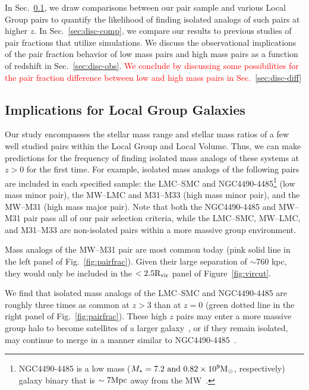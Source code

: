 \documentclass[twocolumn]{aastex631}
\newcommand{\add}[1]{\textcolor{red}{#1}}
\newcommand{\Rvir}{\ensuremath{\rm R_{vir}}}
\begin{document}
In Sec.~\ref{sec:disc-LG}, we draw comparisons between our pair sample and various Local Group pairs to quantify the likelihood of finding isolated analogs of such pairs at higher $z$.
In Sec.~\ref{sec:disc-comp}, we compare our results to previous studies of pair fractions that utilize simulations. 
We discuss the observational implications of the pair fraction behavior of low mass pairs and high mass pairs as a function of redshift
in Sec.~\ref{sec:disc-obs}.
\add{We conclude by discussing some possibilities for the pair fraction difference between low and high mass pairs in Sec.~\ref{sec:disc-diff}}

   \subsection{Implications for Local Group Galaxies}\label{sec:disc-LG}
    Our study encompasses the stellar mass range and stellar mass ratios of a few well studied pairs within the Local Group and Local Volume.
    Thus, we can make predictions for the frequency of finding isolated mass analogs of these systems at $z>0$ for the first time. 
    For example, isolated mass analogs of the following pairs are included in each specified sample:
    the LMC--SMC and NGC4490-4485\footnote{NGC4490-4485 is a low mass ($M_* = 7.2 \mbox{ and } 0.82 \times 10^9\mathrm{M}_\odot$, respectively) galaxy binary that is $\sim7\mathrm{Mpc}$ away from the MW~\citep{Theureau2007,Pearson2018}.} (low mass minor pair), the MW--LMC and M31--M33 (high mass minor pair), and the MW--M31 (high mass major pair).
    Note that both the NGC4490-4485 and MW--M31 pair pass all of our pair selection criteria, while the LMC--SMC,  MW--LMC, and M31--M33 are non-isolated pairs within a more massive group environment.

    Mass analogs of the MW--M31 pair are most common today (pink solid line in the left panel of Fig.~\ref{fig:pairfrac}). 
    Given their large separation of $\sim$760 kpc, they would only be included in the $<2.5\Rvir$ panel of Figure~\ref{fig:vircut}. 

    We find that isolated mass analogs of the LMC--SMC and NGC4490-4485 are roughly three times as common at $z>3$ than at $z=0$ (green dotted line in the right panel of Fig.~\ref{fig:pairfrac}). 
    These high $z$ pairs may enter a more massive group halo to become satellites of a larger galaxy~\citep[like the LMC--SMC, ][]{Besla2007,Patel2017a-Orbits}, or if they remain isolated, may continue to merge in a manner similar to NGC4490-4485~\citep{Pearson2018}. 
    
\end{document}

